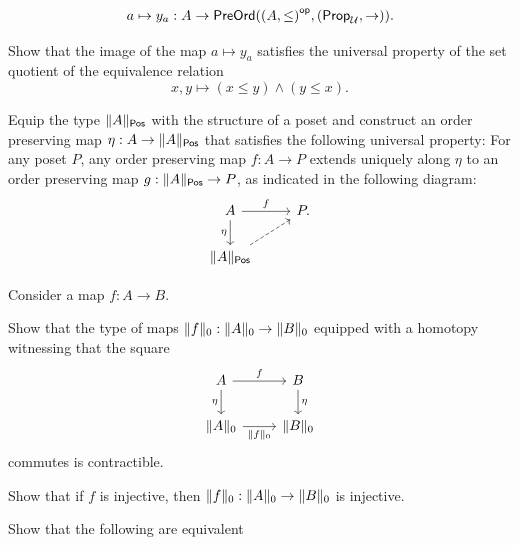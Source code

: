 \begin{exercises}
  \begin{equation*}
    a\mapsto y_a : A\to \preord(\op{(A,\leq)},{(\prop_\UU,{\to})}).
  \end{equation*}
  \begin{subexenum}
  \item Show that the image of the map $a\mapsto y_a$ satisfies the universal property of the set quotient of the equivalence relation
    \begin{equation*}
      x,y\mapsto (x\leq y)\land (y\leq x).
    \end{equation*}
  \item Equip the type $\posetreflection{A}$ with the structure of a poset and construct an order preserving map $\eta : A \to \posetreflection{A}$ that satisfies the following universal property: For any poset $P$, any order preserving map $f:A\to P$ extends uniquely along $\eta$ to an order preserving map $g:\posetreflection{A}\to P$, as indicated in the following diagram:
  \begin{equation*}
    \begin{tikzcd}
      A \arrow[r,"f"] \arrow[d,swap,"\eta"] & P. \\
      \posetreflection{A} \arrow[ur,dashed]
    \end{tikzcd}
  \end{equation*}
  \end{subexenum}
  \exitem Consider a map $f:A\to B$.
  \begin{subexenum}
  \item Show that the type of maps $\trunc{0}{f}:\trunc{0}{A}\to\trunc{0}{B}$ equipped with a homotopy witnessing that the square
    \begin{equation*}
      \begin{tikzcd}
        A \arrow[r,"f"] \arrow[d,swap,"\eta"] & B \arrow[d,"\eta"] \\
        \trunc{0}{A} \arrow[r,swap,"\trunc{0}{f}"] & \trunc{0}{B}
      \end{tikzcd}
    \end{equation*}
    commutes is contractible.
  \item Show that if $f$ is injective, then $\trunc{0}{f}:\trunc{0}{A}\to\trunc{0}{B}$ is injective.
  \item Show that the following are equivalent

\end{subexenum}
\end{exercises}
